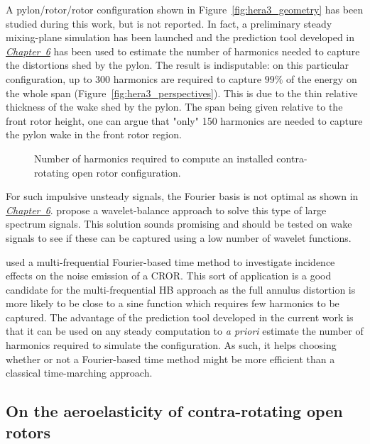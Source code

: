 A pylon/rotor/rotor configuration shown in Figure~\ref{fig:hera3_geometry}
has been studied during this work, but is not reported.
In fact, a preliminary steady mixing-plane simulation has been
launched and the prediction tool developed in
\hyperref[cha:limitations_convergence]{\emph{Chapter~6}}
has been used to estimate the number
of harmonics needed to capture the distortions shed by the pylon.
The result is indisputable: on this particular configuration,
up to 300 harmonics are required to capture $99\%$ of the energy
on the whole span (Figure~\ref{fig:hera3_perspectives}). 
This is due to the thin relative thickness of the
wake shed by the pylon.
The span being given relative to the front
rotor height, one can argue that "only" 150 harmonics are
needed to capture the pylon wake in the front rotor region.
\begin{figure}[htp]
  \centering
  \caption{Number of harmonics required to compute an 
  installed contra-rotating open rotor configuration.}
\end{figure}

For such impulsive unsteady signals, the Fourier basis
is not optimal as shown in 
\hyperref[cha:limitations_convergence]{\emph{Chapter~6}}.
\citet{Li2002} propose a wavelet-balance approach to
solve this type of large spectrum signals. This
solution sounds promising and should be tested on
wake signals to see if these can be captured
using a low number of wavelet functions.

\citet{Ferrante2013} used a multi-frequential Fourier-based time
method to investigate incidence effects on the noise
emission of a CROR. This sort of application is a good candidate
for the multi-frequential HB approach as the full annulus
distortion is more likely to be close to a sine function which
requires few harmonics to be captured. The advantage of the
prediction tool developed in the current work is that
it can be used on any steady computation to \emph{a priori}
estimate the number of harmonics required to simulate the
configuration. As such, it helps choosing whether or not
a Fourier-based time method might be more efficient than
a classical time-marching approach.


\subsection*{On the aeroelasticity of contra-rotating open rotors}

